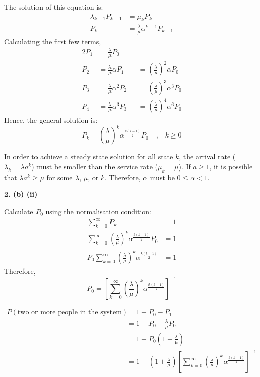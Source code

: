 \documentclass[12pt, a4paper]{article}
\begin{document}
\noindent The solution of this equation is:
\begin{align*}
  \lambda_{k-1}P_{k-1} &= \mu_kP_k \\
  P_k &= \frac{\lambda}{\mu}\alpha^{k-1}P_{k-1}
\end{align*}
Calculating the first few terms,
\begin{alignat*}{2}
  P_1 &= \frac{\lambda}{\mu}P_0 \\
  P_2 &= \frac{\lambda}{\mu}\alpha P_1 &&= \left(\frac{\lambda}{\mu}\right)^2\alpha P_0 \\
  P_3 &= \frac{\lambda}{\mu}\alpha^2 P_2 &&= \left(\frac{\lambda}{\mu}\right)^3\alpha^3 P_0 \\
  P_4 &= \frac{\lambda}{\mu}\alpha^3 P_3 &&= \left(\frac{\lambda}{\mu}\right)^4\alpha^6 P_0
\end{alignat*}
Hence, the general solution is:
\[P_k = \left(\frac{\lambda}{\mu}\right)^k \alpha^{\textstyle\frac{k(k-1)}{2}}P_0 \quad\text{,}\quad k \geq 0\]

\noindent In order to achieve a steady state solution for all state \(k\), the arrival rate (\(\lambda_k = \lambda a^k\)) must be smaller than the service rate (\(\mu_k = \mu\)). If \(a \geq 1\), it is possible that \(\lambda a^k \geq \mu\) for some \(\lambda\), \(\mu\), or \(k\). Therefore, \(\alpha\) must be \(0 \leq \alpha < 1\).

\newpage
\noindent\textbf{2. (b) (ii)}

\noindent Calculate \(P_0\) using the normalisation condition:
\begin{align*}
  \sum_{k=0}^{\infty} P_k &= 1 \\
  \sum_{k=0}^{\infty} \left(\frac{\lambda}{\mu}\right)^k \alpha^{\textstyle\frac{k(k-1)}{2}}P_0 &= 1 \\
  P_0 \sum_{k=0}^{\infty} \left(\frac{\lambda}{\mu}\right)^k \alpha^{\textstyle\frac{k(k-1)}{2}} &= 1
\end{align*}
Therefore,
\[P_0 = \left[\sum_{k=0}^{\infty} \left(\frac{\lambda}{\mu}\right)^k\alpha^{\textstyle\frac{k(k-1)}{2}}\right]^{-1}\]

\begin{align*}
  P(\text{two or more people in the system}) &= 1 - P_0 - P_1 \\
  &= 1 - P_0 - \frac{\lambda}{\mu}P_0 \\
  &= 1 - P_0\left(1 + \frac{\lambda}{\mu}\right) \\
  &= 1 - \left(1 + \frac{\lambda}{\mu}\right)\left[\sum_{k=0}^{\infty} \left(\frac{\lambda}{\mu}\right)^k\alpha^{\textstyle\frac{k(k-1)}{2}}\right]^{-1}
\end{align*}
\end{document}
